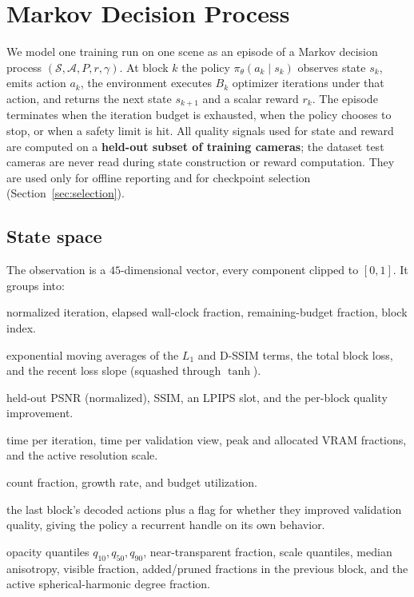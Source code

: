 \documentclass[11pt]{article}
\begin{document}
\section{Markov Decision Process}

We model one training run on one scene as an episode of a Markov decision process
$(\mathcal{S}, \mathcal{A}, P, r, \gamma)$. At block $k$ the policy
$\pi_\theta(a_k \mid s_k)$ observes state $s_k$, emits action $a_k$, the
environment executes $B_k$ optimizer iterations under that action, and returns the
next state $s_{k+1}$ and a scalar reward $r_k$. The episode terminates when the
iteration budget is exhausted, when the policy chooses to stop, or when a safety
limit is hit. All quality signals used for state and reward are computed on a
\textbf{held-out subset of training cameras}; the dataset test cameras are never
read during state construction or reward computation. They are used only for
offline reporting and for checkpoint selection (Section~\ref{sec:selection}).

\subsection{State space}
\label{sec:state}

The observation is a $45$-dimensional vector, every component clipped to $[0,1]$.
It groups into:

\begin{description}[leftmargin=1.5em,style=nextline]
  \item[Progress (4)] normalized iteration, elapsed wall-clock fraction,
  remaining-budget fraction, block index.
  \item[Loss (4)] exponential moving averages of the $L_1$ and D-SSIM terms, the
  total block loss, and the recent loss slope (squashed through $\tanh$).
  \item[Validation (4)] held-out PSNR (normalized), SSIM, an LPIPS slot, and the
  per-block quality improvement.
  \item[Compute (5)] time per iteration, time per validation view, peak and
  allocated VRAM fractions, and the active resolution scale.
  \item[Gaussian population, scalar (3)] count fraction, growth rate, and budget
  utilization.
  \item[Previous action (14)] the last block's decoded actions plus a flag for
  whether they improved validation quality, giving the policy a recurrent handle
  on its own behavior.
  \item[Gaussian population, distributional (11)] opacity quantiles
  $q_{10}, q_{50}, q_{90}$, near-transparent fraction, scale quantiles, median
  anisotropy, visible fraction, added/pruned fractions in the previous block, and
  the active spherical-harmonic degree fraction.
\end{description}
\end{document}
